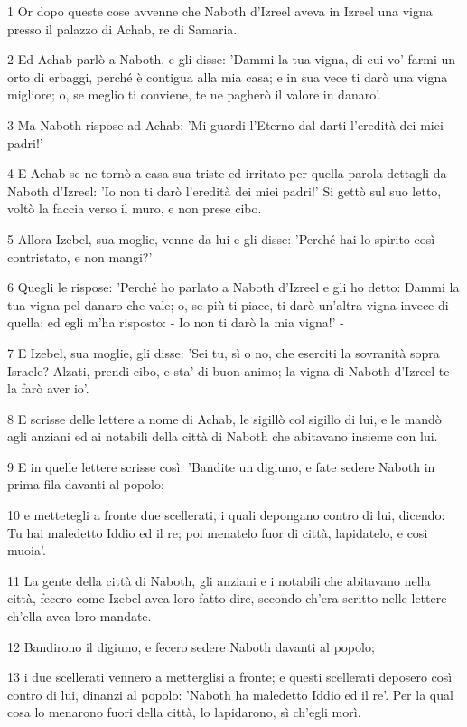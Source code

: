 \par 1 Or dopo queste cose avvenne che Naboth d'Izreel aveva in Izreel una vigna presso il palazzo di Achab, re di Samaria.
\par 2 Ed Achab parlò a Naboth, e gli disse: 'Dammi la tua vigna, di cui vo' farmi un orto di erbaggi, perché è contigua alla mia casa; e in sua vece ti darò una vigna migliore; o, se meglio ti conviene, te ne pagherò il valore in danaro'.
\par 3 Ma Naboth rispose ad Achab: 'Mi guardi l'Eterno dal darti l'eredità dei miei padri!'
\par 4 E Achab se ne tornò a casa sua triste ed irritato per quella parola dettagli da Naboth d'Izreel: 'Io non ti darò l'eredità dei miei padri!' Si gettò sul suo letto, voltò la faccia verso il muro, e non prese cibo.
\par 5 Allora Izebel, sua moglie, venne da lui e gli disse: 'Perché hai lo spirito così contristato, e non mangi?'
\par 6 Quegli le rispose: 'Perché ho parlato a Naboth d'Izreel e gli ho detto: Dammi la tua vigna pel danaro che vale; o, se più ti piace, ti darò un'altra vigna invece di quella; ed egli m'ha risposto: - Io non ti darò la mia vigna!' -
\par 7 E Izebel, sua moglie, gli disse: 'Sei tu, sì o no, che eserciti la sovranità sopra Israele? Alzati, prendi cibo, e sta' di buon animo; la vigna di Naboth d'Izreel te la farò aver io'.
\par 8 E scrisse delle lettere a nome di Achab, le sigillò col sigillo di lui, e le mandò agli anziani ed ai notabili della città di Naboth che abitavano insieme con lui.
\par 9 E in quelle lettere scrisse così: 'Bandite un digiuno, e fate sedere Naboth in prima fila davanti al popolo;
\par 10 e mettetegli a fronte due scellerati, i quali depongano contro di lui, dicendo: Tu hai maledetto Iddio ed il re; poi menatelo fuor di città, lapidatelo, e così muoia'.
\par 11 La gente della città di Naboth, gli anziani e i notabili che abitavano nella città, fecero come Izebel avea loro fatto dire, secondo ch'era scritto nelle lettere ch'ella avea loro mandate.
\par 12 Bandirono il digiuno, e fecero sedere Naboth davanti al popolo;
\par 13 i due scellerati vennero a metterglisi a fronte; e questi scellerati deposero così contro di lui, dinanzi al popolo: 'Naboth ha maledetto Iddio ed il re'. Per la qual cosa lo menarono fuori della città, lo lapidarono, sì ch'egli morì.
